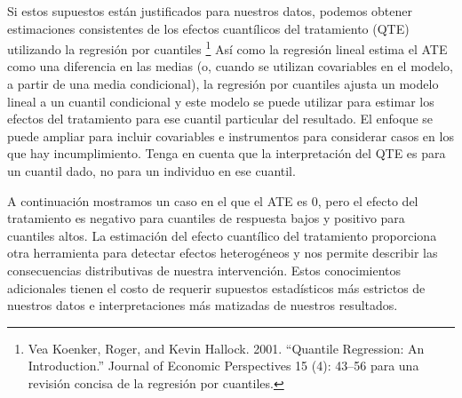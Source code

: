 \documentclass[
]{article}
\begin{document}
Si estos supuestos están justificados para nuestros datos, podemos
obtener estimaciones consistentes de los efectos cuantílicos del
tratamiento (QTE) utilizando la regresión por cuantiles \footnote{Vea
  Koenker, Roger, and Kevin Hallock. 2001. ``Quantile Regression: An
  Introduction.'' Journal of Economic Perspectives 15 (4): 43--56 para
  una revisión concisa de la regresión por cuantiles.} Así como la
regresión lineal estima el ATE como una diferencia en las medias (o,
cuando se utilizan covariables en el modelo, a partir de una media
condicional), la regresión por cuantiles ajusta un modelo lineal a un
cuantil condicional y este modelo se puede utilizar para estimar los
efectos del tratamiento para ese cuantil particular del resultado. El
enfoque se puede ampliar para incluir covariables e instrumentos para
considerar casos en los que hay incumplimiento. Tenga en cuenta que la
interpretación del QTE es para un cuantil dado, no para un individuo en
ese cuantil.

A continuación mostramos un caso en el que el ATE es 0, pero el efecto
del tratamiento es negativo para cuantiles de respuesta bajos y positivo
para cuantiles altos. La estimación del efecto cuantílico del
tratamiento proporciona otra herramienta para detectar efectos
heterogéneos y nos permite describir las consecuencias distributivas de
nuestra intervención. Estos conocimientos adicionales tienen el costo de
requerir supuestos estadísticos más estrictos de nuestros datos e
interpretaciones más matizadas de nuestros resultados.
\end{document}
